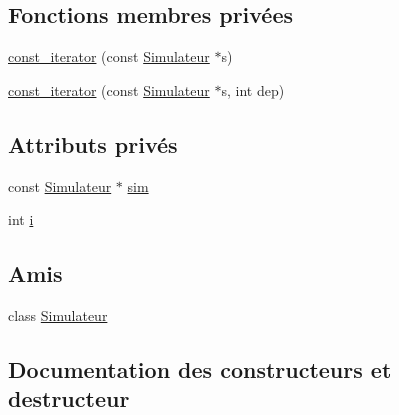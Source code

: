 \subsection*{Fonctions membres privées}
\begin{DoxyCompactItemize}
\item 
\hyperlink{class_simulateur_1_1const__iterator_ac86b41f09bf9b8975b7f4d91ee5f0d52}{const\+\_\+iterator} (const \hyperlink{class_simulateur}{Simulateur} $\ast$s)
\item 
\hyperlink{class_simulateur_1_1const__iterator_a8baadf24b767532a6e5d3d4ed59e0eab}{const\+\_\+iterator} (const \hyperlink{class_simulateur}{Simulateur} $\ast$s, int dep)
\end{DoxyCompactItemize}
\subsection*{Attributs privés}
\begin{DoxyCompactItemize}
\item 
const \hyperlink{class_simulateur}{Simulateur} $\ast$ \hyperlink{class_simulateur_1_1const__iterator_af879bec3ae8b71f1c81826e0c1b24077}{sim}
\item 
int \hyperlink{class_simulateur_1_1const__iterator_aa4b2261e7087b7c68391c893aa531973}{i}
\end{DoxyCompactItemize}
\subsection*{Amis}
\begin{DoxyCompactItemize}
\item 
class \hyperlink{class_simulateur_1_1const__iterator_ae6c3966e699bf920c86e0bd006bd8183}{Simulateur}
\end{DoxyCompactItemize}


\subsection{Documentation des constructeurs et destructeur}
